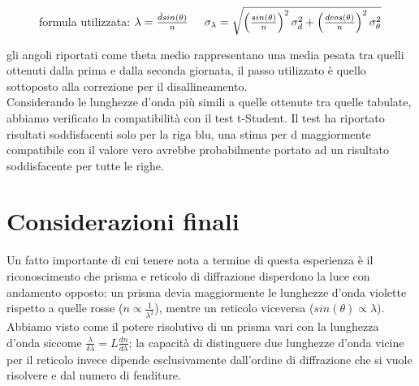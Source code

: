 \documentclass[a4paper]{article}
\theoremstyle{definition}
\begin{document}
\begin{figure}[!htbp]
	\captionsetup{labelformat=empty}
	\caption{formula utilizzata: \(\lambda = \frac{\hat{d}sin(\theta)}{n} \hspace{0.5 cm} \sigma_{\lambda} =\sqrt{\left ( \frac{sin(\theta )}{n} \right )^{2}\sigma_{d}^{2} + \left ( \frac{dcos(\theta )}{n} \right )^{2}\sigma_{\theta }^{2}}\)}
\end{figure}

\noindent gli angoli riportati come theta medio rappresentano una media pesata tra quelli ottenuti dalla prima e dalla seconda giornata, il passo utilizzato è quello sottoposto alla correzione per il disallineamento. \\
Considerando le lunghezze d'onda più simili a quelle ottenute tra quelle tabulate, abbiamo verificato la compatibilità con il test t-Student. Il test ha riportato risultati soddisfacenti solo per la riga blu, una stima per d maggiormente compatibile con il valore vero avrebbe probabilmente portato ad un risultato soddisfacente per tutte le righe.

\section{Considerazioni finali}

Un fatto importante di cui tenere nota a termine di questa esperienza è il riconoscimento che prisma e reticolo di diffrazione disperdono la luce con andamento opposto: un prisma devia maggiormente le lunghezze d'onda violette rispetto a quelle rosse (\(n \propto \frac{1}{\lambda^{2}}\)), mentre un reticolo viceversa (\(sin(\theta) \propto \lambda\)). \\
Abbiamo visto come il potere risolutivo di un prisma vari con la lunghezza d'onda siccome \(\frac{\lambda}{\delta \lambda} = L\frac{dn}{d\lambda}\); la capacità di distinguere due lunghezze d'onda vicine per il reticolo invece dipende esclusivamente dall'ordine di diffrazione che si vuole risolvere e dal numero di fenditure. \\
\end{document}
